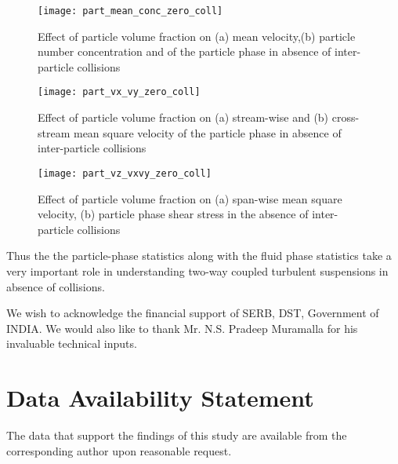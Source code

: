 \documentclass[aip,graphicx]{revtex4-1}
\begin{document}
\begin{figure*}[!h]
			\texttt{[image: part\_mean\_conc\_zero\_coll]}
			\caption{Effect of particle volume fraction on (a) mean velocity,(b) particle number concentration and of the particle phase in absence of inter-particle collisions} 
			\label{fig:particle_phase_stat_1_zero_coll}
		\end{figure*}
		
		\begin{figure*}[!h]
			\texttt{[image: part\_vx\_vy\_zero\_coll]}
			\caption{Effect of particle volume fraction on (a) stream-wise and (b) cross-stream mean square velocity of the particle phase in absence of inter-particle collisions}
			\label{fig:particle_phase_stat_2_zero_coll}
		\end{figure*} 
		\begin{figure*}[!h]
			\texttt{[image: part\_vz\_vxvy\_zero\_coll]}
			\caption{Effect of particle volume fraction on (a) span-wise mean square velocity, (b) particle phase shear stress in the  absence of inter-particle collisions} 
			\label{fig:particle_phase_stat_3_zero_coll}
		\end{figure*}
   Thus the the particle-phase statistics along with the fluid phase statistics take a very important role in understanding two-way coupled turbulent suspensions in absence of collisions. 

	\clearpage
		\begin{acknowledgments}
				We wish to acknowledge the financial support of SERB, DST, Government of INDIA. We would also like to thank Mr. N.S. Pradeep Muramalla for his invaluable technical inputs.  
			\end{acknowledgments}
		
		\section*{Data Availability Statement}
		The data that support the findings of this study are available
		from the corresponding author upon reasonable request.





	
\end{document}
